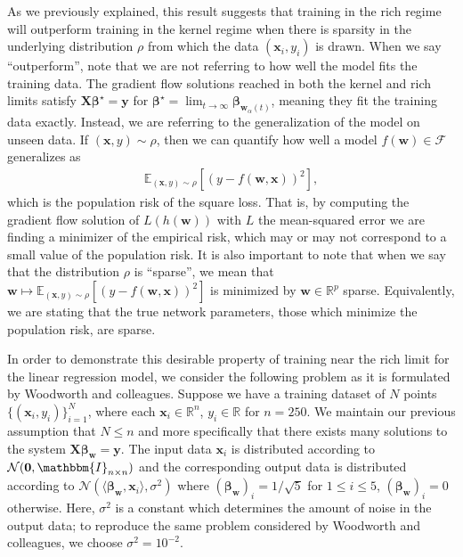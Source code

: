 \documentclass{article}
\begin{document}
As we previously explained, this result suggests that training in the rich regime will outperform training in the kernel regime when there is sparsity in the underlying distribution $\rho$ from which the data $(\boldsymbol{x}_i, y_i)$ is drawn. When we say \enquote{outperform}, note that we are not referring to how well the model fits the training data. The gradient flow solutions reached in both the kernel and rich limits satisfy $\boldsymbol{X}\boldsymbol{\beta}^{\star} = \boldsymbol{y}$ for $\boldsymbol{\beta}^{\star} = \lim_{t \to \infty} \boldsymbol{\beta}_{\boldsymbol{w}_{\alpha}(t)}$, meaning they fit the training data exactly. Instead, we are referring to the generalization of the model on unseen data. If $(\boldsymbol{x}, y) \sim \rho$, then we can quantify how well a model $f(\boldsymbol{w}) \in \mathcal{F}$ generalizes as
\begin{align}\label{poprisk}
\mathbb{E}_{(\boldsymbol{x}, y) \sim \rho}[(y - f(\boldsymbol{w}, \boldsymbol{x}))^2],
\end{align}
which is the population risk of the square loss. That is, by computing the gradient flow solution of $L(h(\boldsymbol{w}))$ with $L$ the mean-squared error we are finding a minimizer of the empirical risk, which may or may not correspond to a small value of the population risk. It is also important to note that when we say that the distribution $\rho$ is \enquote{sparse}, we mean that $\boldsymbol{w} \mapsto \mathbb{E}_{(\boldsymbol{x}, y) \sim \rho}[(y - f(\boldsymbol{w}, \boldsymbol{x}))^2]$ is minimized by $\boldsymbol{w} \in \mathbb{R}^p$ sparse. Equivalently, we are stating that the true network parameters, those which minimize the population risk, are sparse. 

In order to demonstrate this desirable property of training near the rich limit for the linear regression model, we consider the following problem as it is formulated by Woodworth and colleagues. Suppose we have a training dataset of $N$ points $\{(\boldsymbol{x}_i, y_i)\}_{i=1}^N$, where each $\boldsymbol{x}_i \in \mathbb{R}^n$, $y_i \in \mathbb{R}$ for $n = 250$. We maintain our previous assumption that $N \leq n$ and more specifically that there exists many solutions to the system $\boldsymbol{X}\boldsymbol{\beta}_{\boldsymbol{w}} = \boldsymbol{y}$. The input data $\boldsymbol{x}_i$ is distributed according to $\mathcal{N}(\boldsymbol{0},\mathbbm{I}_{n \times n})$ and the corresponding output data is distributed according to $\mathcal{N}(\langle \boldsymbol{\beta}_{\boldsymbol{w}}, \boldsymbol{x}_i \rangle, \sigma^2)$ where $(\boldsymbol{\beta}_{\boldsymbol{w}})_i = 1/\sqrt{5}$ for $1 \leq i \leq 5$, $(\boldsymbol{\beta}_{\boldsymbol{w}})_i = 0$ otherwise. Here, $\sigma^2$ is a constant which determines the amount of noise in the output data; to reproduce the same problem considered by Woodworth and colleagues, we choose $\sigma^2 = 10^{-2}$. 
\end{document}
